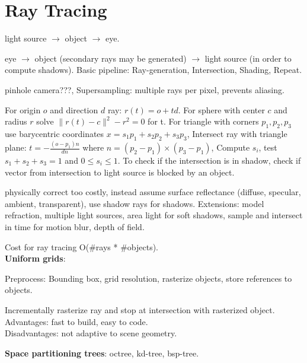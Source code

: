 \section{Ray Tracing}

 light source $\to$ object $\to$ eye.

 eye $\to$ object (secondary rays may be generated) $\to$ light source (in order to compute shadows). Basic pipeline: Ray-generation, Intersection, Shading, Repeat.

 pinhole camera???, Supersampling: multiple rays per pixel, prevents aliasing.

 For origin $o$ and direction $d$ ray: $r(t) = o + td$. For sphere with center $c$ and radius $r$ solve $\|r(t) - c\|^2 - r^2 = 0$ for t. For triangle with corners $p_1, p_2, p_3$ use barycentric coordinates $x = s_1p_1 + s_2p_2 + s_3p_3$, Intersect ray with triangle plane: $t = -\frac{(o-p_1)n}{dn}$ where $n = (p_2 - p_1) \times (p_3 - p_1)$, Compute $s_i$, test $s_1 + s_2 + s_3 = 1$ and $0 \leq s_i \leq 1$. To check if the intersection is in shadow, check if vector from intersection to light source is blocked by an object.

 physically correct too costly, instead assume surface reflectance (diffuse, specular, ambient, transparent), use shadow rays for shadows. Extensions: model refraction,  multiple light sources, area light for soft shadows, sample and intersect in time for motion blur, depth of field.

 Cost for ray tracing O(\#rays * \#objects). \\
\textbf{Uniform grids}:
\begin{compactitem}
    \item Preprocess: Bounding box, grid resolution, rasterize objects, store references to objects. 
    \item Incrementally rasterize ray and stop at intersection with rasterized object. \\Advantages: fast to build, easy to code. 
    \\Disadvantages: not adaptive to scene geometry.
\end{compactitem}
\textbf{Space partitioning trees}: octree, kd-tree, bsp-tree.